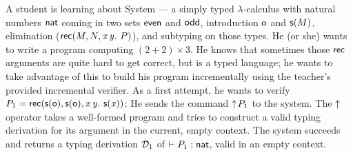 \documentclass{llncs}
\begin{document}











A student is learning about System  --- a simply
typed $\lambda$-calculus with natural numbers $\text{\textsf{nat}}$ coming in
two sets $\text{\textsf{even}}$ and $\text{\textsf{odd}}$, introduction $\text{\textsf{o}}$ and $\text{\textsf{s}} ({M})$,
elimination ($\text{\textsf{rec}}({M},{N},{\text{\textit{x}}}\,{\text{\textit{y}}}.\ {P})$), and subtyping on those types. He (or
she) wants to write a program computing $(2+2)\times 3$. He knows that
sometimes those $\text{\textsf{rec}}$ arguments are quite hard to get correct,
but  is a typed language; he wants to take advantage
of this to build his program incrementally using the teacher's
provided incremental verifier. As a first attempt, he wants to verify
$P_1 = \text{\textsf{rec}}({\text{\textsf{s}} ({\text{\textsf{o}}})},{\text{\textsf{s}} ({\text{\textsf{o}}})},{\text{\textit{x}}}\,{\text{\textit{y}}}.\ {\text{\textsf{s}} ({\text{\textit{x}}})})$: He sends the command
$\uparrow\!{P_1}$ to the system. The $\uparrow\!{}$ operator takes a
well-formed program and tries to construct a valid typing derivation
for its argument in the current, empty context. The system succeeds
and returns a typing derivation $\mathcal D_1$ of \/ $\vdash P_1 :
\text{\textsf{nat}}$, valid in an empty context.
\end{document}
